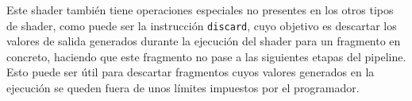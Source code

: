 Este shader también tiene operaciones especiales no presentes en los otros tipos
de shader, como puede ser la instrucción \verb|discard|, cuyo objetivo es
descartar los valores de salida generados durante la ejecución del shader para
un fragmento en concreto, haciendo que este fragmento no pase a las siguientes
etapas del pipeline. Esto puede ser útil para descartar fragmentos cuyos valores
generados en la ejecución se queden fuera de unos límites impuestos por el
programador.
